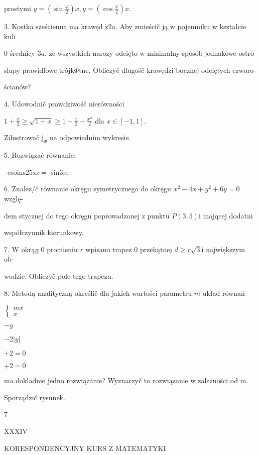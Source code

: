\documentclass[a4paper,12pt]{article}
\begin{document}
prostymi $y=(\displaystyle \sin\frac{\varphi}{2})x, y=(\displaystyle \cos\frac{\varphi}{2})x.$

3. Kostka sześcienna ma krawęd $\acute{\mathrm{z}} 2a$. Aby zmieścič ją $\mathrm{w}$ pojemniku $\mathrm{w}$ kształcie kuli

$0$ średnicy $3a$, ze wszystkich narozy odcięto $\mathrm{w}$ minimalny sposób jednakowe ostro-

slupy prawidfowe trójk$\Phi$tne. Obliczyč dlugośč krawędzi bocznej odciętych czworo-

ścianów?

4. Udowodnič prawdziwośč nierówności

$1+\displaystyle \frac{x}{2}\geq\sqrt{1+x}\geq 1+\frac{x}{2}-\frac{x^{2}}{2}$ dla $x\in[-1,1].$

Zilustrowač $\mathrm{j}_{\Phi}$ na odpowiednim wykresie.

5. Rozwiązač równanie:

--csoins25{\it xx}$=$-sin3{\it x}.

6. Znalez/č równanie okręgu symetrycznego do okręgu $x^{2}-4x+y^{2}+6y=0$ wzglę-

dem stycznej do tego okręgu poprowadzonej $\mathrm{z}$ punktu $P(3,5) \mathrm{i}$ majqcej dodatni

wspófczynnik kierunkowy.

7. $\mathrm{W}$ okrąg $0$ promieniu $r$ wpisano trapez $0$ przekątnej $d\geq r\sqrt{3}\mathrm{i}$ największym ob-

wodzie. Obliczyč pole tego trapezu.

8. Metodą analityczną określič dla jakich wartości parametru $m$ układ równań

$\left\{\begin{array}{l}
mx\\
x
\end{array}\right.$

$-y$

$-2|y|$

$+2=0$

$+2=0$

ma dokladnie jedno rozwiązanie? Wyznaczyč to rozwiązanie w zalezności od m.

Sporządzič rysunek.

7







XXXIV

KORESPONDENCYJNY KURS Z MATEMATYKI
\end{document}
